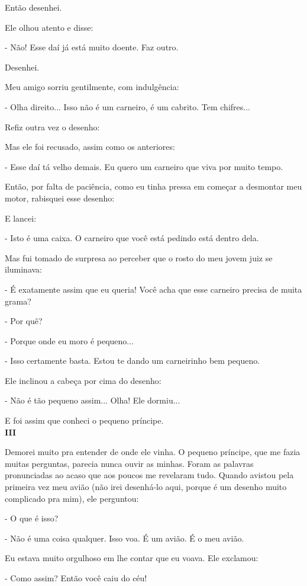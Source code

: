 \begin{Parallel}[p]{}{}
{Então desenhei.

Ele olhou atento e disse:

- Não! Esse daí já está muito doente. Faz outro.

Desenhei.

Meu amigo sorriu gentilmente, com indulgência:

- Olha direito... Isso não é um carneiro, é um cabrito. Tem chifres...

Refiz outra vez o desenho:

Mas ele foi recusado, assim como os anteriores:

- Esse daí tá velho demais. Eu quero um carneiro que viva por muito
tempo.

Então, por falta de paciência, como eu tinha pressa em começar a
desmontar meu motor, rabisquei esse desenho:

E lancei:

- Isto é uma caixa. O carneiro que você está pedindo está dentro dela.

Mas fui tomado de surpresa ao perceber que o rosto do meu jovem juiz se
iluminava:

- É exatamente assim que eu queria! Você acha que esse carneiro precisa
de muita grama?

- Por quê?

- Porque onde eu moro é pequeno...

- Isso certamente basta. Estou te dando um carneirinho bem pequeno.

Ele inclinou a cabeça por cima do desenho:

- Não é tão pequeno assim... Olha! Ele dormiu...

E foi assim que conheci o pequeno príncipe.\\

\textbf{III}

Demorei muito pra entender de onde ele vinha. O pequeno príncipe, que me
fazia muitas perguntas, parecia nunca ouvir as minhas. Foram as palavras
pronunciadas ao acaso que aos poucos me revelaram tudo. Quando avistou
pela primeira vez meu avião (não irei desenhá-lo aqui, porque é um
desenho muito complicado pra mim), ele perguntou:

- O que é isso?

- Não é uma coisa qualquer. Isso voa. É um avião. É o meu avião.

Eu estava muito orgulhoso em lhe contar que eu voava. Ele exclamou:

- Como assim? Então você caiu do céu!

}
\end{Parallel}
